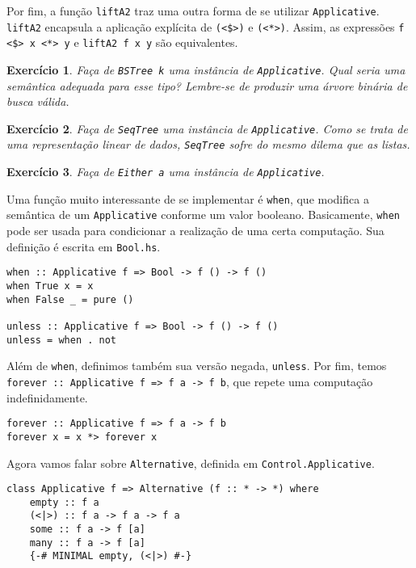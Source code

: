 \documentclass[a4paper]{article}
\newtheorem{exercicio}{Exercício}
\begin{document}
Por fim, a função \texttt{liftA2} traz uma outra forma de se utilizar \texttt{Applicative}.
\texttt{liftA2} encapsula a aplicação explícita de \texttt{(<\$>)} e \texttt{(<*>)}.
Assim, as expressões \texttt{f <\$> x <*> y} e \mbox{\texttt{liftA2 f x y}} são equivalentes.

\begin{exercicio}
	Faça de \emph{\texttt{BSTree k}} uma instância de \emph{\texttt{Applicative}}.
	Qual seria uma semântica adequada para esse tipo?
	Lembre-se de produzir uma árvore binária de busca válida.
\end{exercicio}

\begin{exercicio}
	Faça de \emph{\texttt{SeqTree}} uma instância de \emph{\texttt{Applicative}}.
	Como se trata de uma representação linear de dados, \emph{\texttt{SeqTree}} sofre do mesmo dilema que as listas.
\end{exercicio}

\begin{exercicio}
	Faça de \emph{\texttt{Either a}} uma instância de \emph{\texttt{Applicative}}.
\end{exercicio}

Uma função muito interessante de se implementar é \texttt{when}, que modifica a semântica de um \texttt{Applicative} conforme um valor booleano.
Basicamente, \texttt{when} pode ser usada para condicionar a realização de uma certa computação.
Sua definição é escrita em \texttt{Bool.hs}.

\begin{verbatim}
when :: Applicative f => Bool -> f () -> f ()
when True x = x
when False _ = pure ()

unless :: Applicative f => Bool -> f () -> f ()
unless = when . not
\end{verbatim}

Além de \texttt{when}, definimos também sua versão negada, \texttt{unless}.
Por fim, temos \texttt{forever :: Applicative f => f a -> f b}, que repete uma computação indefinidamente.

\begin{verbatim}
forever :: Applicative f => f a -> f b
forever x = x *> forever x
\end{verbatim}

Agora vamos falar sobre \texttt{Alternative}, definida em \texttt{Control.Applicative}.

\begin{verbatim}
class Applicative f => Alternative (f :: * -> *) where
	empty :: f a
	(<|>) :: f a -> f a -> f a
	some :: f a -> f [a]
	many :: f a -> f [a]
	{-# MINIMAL empty, (<|>) #-}
\end{verbatim}
\end{document}
